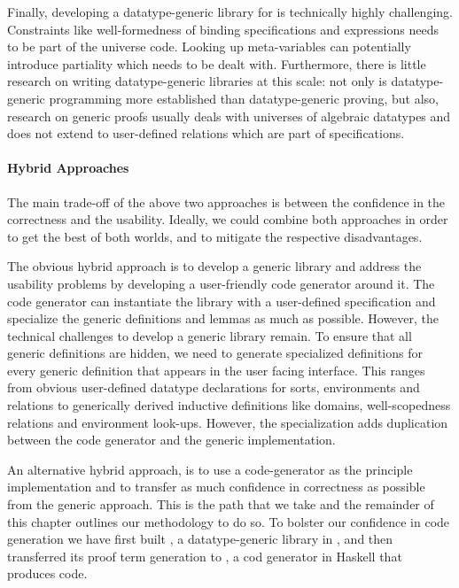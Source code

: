 Finally, developing a datatype-generic library for \Knot is technically highly challenging.
Constraints like well-formedness of binding specifications and expressions needs
to be part of the universe code. Looking up meta-variables can potentially
introduce partiality which needs to be dealt with. Furthermore, there is little
research on writing datatype-generic libraries at this scale: not only is
datatype-generic programming more established than datatype-generic proving, but
also, research on generic proofs usually deals with universes of algebraic
datatypes and does not extend to user-defined relations which are part of \Knot
specifications.

\paragraph{Hybrid Approaches}

The main trade-off of the above two approaches is between the confidence in the
correctness and the usability. Ideally, we could combine both approaches in
order to get the best of both worlds, and to mitigate the respective disadvantages.

The obvious hybrid approach is to develop a generic library and address the
usability problems by developing a user-friendly code generator around it. The
code generator can instantiate the library with a user-defined specification
and specialize the generic definitions and lemmas as much as possible. However,
the technical challenges to develop a generic library remain.
To ensure that all generic definitions are hidden, we need to generate
specialized definitions for every generic definition that appears in the user
facing interface. This ranges from obvious user-defined datatype
declarations for sorts, environments and relations to generically derived
inductive definitions like domains, well-scopedness relations and environment
look-ups. However, the specialization adds duplication between the
code generator and the generic implementation.


An alternative hybrid approach, is to use a code-generator as the principle
implementation and to transfer as much confidence in correctness as possible
from the generic approach. This is the path that we take and the remainder of
this chapter outlines our methodology to do so. To bolster our
confidence in code generation we have first built \Loom, a
datatype-generic library in \Coq, and then transferred its proof term
generation to \Needle, a cod generator in Haskell that produces \Coq code.

